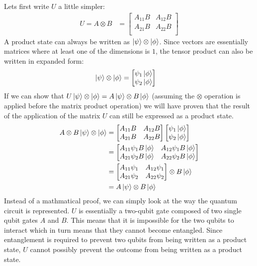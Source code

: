 \documentclass[12pt]{article}
\newcommand{\bmat}[1]{\begin{bmatrix}#1\end{bmatrix}}
\newenvironment{answer}{\begingroup\setlength{\leftskip}{-\leftmargin}\begin{framed}}{\end{framed}\endgroup}
\begin{document}
\begin{enumerate}
\begin{answer}
        Lets first write $U$ a little simpler:
        \begin{align*}
            U = A \otimes B &= \bmat{
                A_{11}B &
                A_{12}B \\
                A_{21}B &
                A_{22}B \\
            }
        \end{align*}
        A product state can always be written as $\ket{\psi}\otimes\ket{\phi}$. Since vectors are essentially matrices where at least one of the dimensions is $1$, the tensor product can also be written in expanded form:
        \begin{align*}
            \ket{\psi}\otimes\ket{\phi} &= \bmat{\psi_1\ket{\phi} \\ \psi_2\ket{\phi}}
        \end{align*}
        If we can show that $U\ket{\psi}\otimes\ket{\phi} = A\ket{\psi} \otimes B\ket{\phi}$ (assuming the $\otimes$ operation is applied before the matrix product operation) we will have proven that the result of the application of the matrix $U$ can still be expressed as a product state.
        \begin{align*}
            A \otimes B\ket{\psi}\otimes\ket{\phi} &= \bmat{
                A_{11}B &
                A_{12}B \\
                A_{21}B &
                A_{22}B \\
            }\bmat{\psi_1\ket{\phi} \\ \psi_2\ket{\phi}} \\
            &=\bmat{
                A_{11}\psi_1B\ket{\phi} &
                A_{12}\psi_1B\ket{\phi} \\
                A_{21}\psi_2B\ket{\phi} &
                A_{22}\psi_2B\ket{\phi} \\
            } \\
            &=\bmat{
                A_{11}\psi_1 &
                A_{12}\psi_1 \\
                A_{21}\psi_2 &
                A_{22}\psi_2 \\
            } \otimes B\ket{\phi} \\
            &=A\ket{\psi} \otimes B\ket{\phi}
        \end{align*}
        Instead of a mathmatical proof, we can simply look at the way the quantum circuit is represented. $U$ is essentially a two-qubit gate composed of two single qubit gates $A$ and $B$. This means that it is impossible for the two qubits to interact which in turn means that they cannot become entangled. Since entanglement is required to prevent two qubits from being written as a product state, $U$ cannot possibly prevent the outcome from being written as a product state.
    \end{answer}


\end{enumerate}
\end{document}
